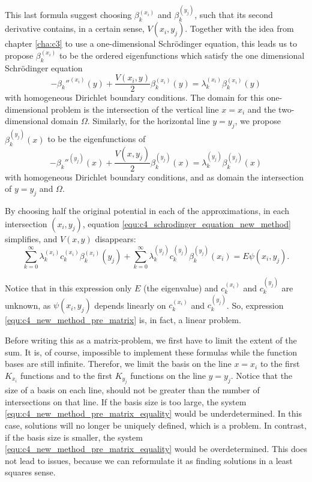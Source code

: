 This last formula suggest choosing $\beta_k^{(x_i)}$ and $\beta_k^{(y_j)}$, such that its second derivative contains, in a certain sense, $V(x_i, y_j)$. Together with the idea from chapter \ref{cha:c3} to use a one-dimensional Schrödinger equation, this leads us to propose $\beta_k^{(x_i)}$ to be the ordered eigenfunctions which satisfy the one dimensional Schrödinger equation
$$
    -\beta_k''^{(x_i)}(y) + \frac{V(x_i, y)}{2}\beta_k^{(x_i)}(y) = \lambda_k^{(x_i)} \beta_k^{(x_i)}(y)
$$
with homogeneous Dirichlet boundary conditions. The domain for this one-dimensional problem is the intersection of the vertical line $x = x_i$ and the two-dimensional domain $\Omega$. Similarly, for the horizontal line $y = y_j$, we propose $\beta_k^{(y_j)}(x)$ to be the eigenfunctions of
$$
    -\beta_k''^{(y_j)}(x) + \frac{V(x, y_j)}{2}\beta_k^{(y_j)}(x) = \lambda_k^{(y_j)} \beta_k^{(y_j)}(x)
$$
with homogeneous Dirichlet boundary conditions, and as domain the intersection of $y = y_j$ and $\Omega$.

By choosing half the original potential in each of the approximations, in each intersection $(x_i, y_j)$, equation \eqref{equ:c4_schrodinger_equation_new_method} simplifies, and $V(x, y)$ disappears:
\begin{equation}\label{equ:c4_new_method_pre_matrix}
    \sum_{k=0}^\infty \lambda_k^{(x_i)} c_k^{(x_i)} \beta^{(x_i)}_k(y_j) + \sum_{k=0}^\infty \lambda_k^{(y_j)} c_k^{(y_j)} \beta_k^{(y_j)}(x_i) = E \psi(x_i, y_j) \text{.}
\end{equation}

Notice that in this expression only $E$ (the eigenvalue) and $c_k^{(x_i)}$ and $c_k^{(y_j)}$ are unknown, as $\psi(x_i, y_j)$ depends linearly on $c_k^{(x_i)}$ and $c_k^{(y_j)}$. So, expression \eqref{equ:c4_new_method_pre_matrix} is, in fact, a linear problem.

Before writing this as a matrix-problem, we first have to limit the extent of the sum. It is, of course, impossible to implement these formulas while the function bases are still infinite. Therefor, we limit the basis on the line $x = x_i$ to the first $K_{x_i}$ functions and to the first $K_{y_j}$ functions on the line $y = y_j$. Notice that the size of a basis on each line, should not be greater than the number of intersections on that line. If the basis size is too large, the system \eqref{equ:c4_new_method_pre_matrix_equality} would be underdetermined. In this case, solutions will no longer be uniquely defined, which is a problem. In contrast, if the basis size is smaller, the system \eqref{equ:c4_new_method_pre_matrix_equality} would be overdetermined. This does not lead to issues, because we can reformulate it as finding solutions in a least squares sense.

